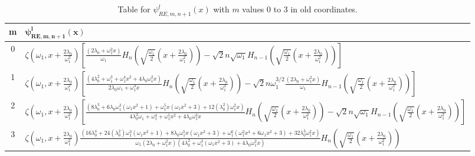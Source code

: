 \documentclass[a4paper, 12pt]{article}
\begin{document}
\begin{table}[htp]%
  \centering
  \renewcommand{\arraystretch}{2.2} %
  \setlength{\tabcolsep}{0.5em} %
  \begin{tabularx}{\textwidth}{|c|X}
  \toprule
  {\bf m} & $\mathbf{\psi_{RE,m,n+1}^l(x)}$ \\
  \toprule
  0 & 
  $\zeta\left(\omega_1,x + \frac{2\lambda_0}{\omega_1^2}\right)\left[\frac{\left(2 \lambda_0 + \omega_1^2 x\right)}{\omega_1} H_n\left(\sqrt{\frac{\omega_1}{2}}\left(x + \frac{2 \lambda_0}{\omega_1^2}\right)\right) 
  - \sqrt{2} n \sqrt{\omega_1} H_{n-1}\left(\sqrt{\frac{\omega_1}{2}}\left(x + \frac{2 \lambda_0}{\omega_1^2}\right)\right)\right]$ \\
  \midrule
  1 & 
  $\scriptstyle\zeta\left(\omega_1,x + \frac{2\lambda_0}{\omega_1^2}\right)\left[\frac{\left(4 \lambda_0^2 + \omega_1^3 + \omega_1^4 x^2 + 4 \lambda_0 \omega_1^2 x\right)}{2 \lambda_0 \omega_1 + \omega_1^3 x} H_n\left(\sqrt{\frac{\omega_1}{2}}\left(x + \frac{2 \lambda_0}{\omega_1^2}\right)\right) 
  - \sqrt{2} n \omega_1^{3/2} \frac{\left(2 \lambda_0 + \omega_1^2 x\right)}{\omega_1} H_{n-1}\left(\sqrt{\frac{\omega_1}{2}}\left(x + \frac{2 \lambda_0}{\omega_1^2}\right)\right)\right]$ \\
  \midrule
  2 & 
  $\scriptstyle\zeta\left(\omega_1,x + \frac{2\lambda_0}{\omega_1^2}\right)\left[\frac{\left(8 \lambda_0^3 + 6 \lambda_0 \omega_1^3 (\omega_1 x^2 + 1) + \omega_1^5 x (\omega_1 x^2 + 3) + 12 (\lambda_0^2) \omega_1^2 x\right)}{4 \lambda_0^2 \omega_1 + \omega_1^4 + \omega_1^5 x^2 + 4 \lambda_0 \omega_1^3 x} H_n\left(\sqrt{\frac{\omega_1}{2}}\left(x + \frac{2 \lambda_0}{\omega_1^2}\right)\right) 
  - \sqrt{2} n \sqrt{\omega_1} H_{n-1}\left(\sqrt{\frac{\omega_1}{2}}\left(x + \frac{2 \lambda_0}{\omega_1^2}\right)\right)\right]$ \\
  \midrule
  3 & 
  $\zeta\left(\omega_1,x + \frac{2\lambda_0}{\omega_1^2}\right)\frac{\left(16 \lambda_0^4 + 24 (\lambda_0^2) \omega_1^3 (\omega_1 x^2 + 1) + 8 \lambda_0 \omega_1^5 x (\omega_1 x^2 + 3) + \omega_1^6 (\omega_1^2 x^4 + 6 \omega_1 x^2 + 3) + 32 \lambda_0^3 \omega_1^2 x\right)}{\omega_1 \left(2 \lambda_0 + \omega_1^2 x\right) \left(4 \lambda_0^2 + \omega_1^3 (\omega_1 x^2 + 3) + 4 \lambda_0 \omega_1^2 x\right)} H_n\left(\sqrt{\frac{\omega_1}{2}}\left(x + \frac{2 \lambda_0}{\omega_1^2}\right)\right)$ \\
  \bottomrule
  \end{tabularx}
  \caption{Table for $\psi_{RE,m,n+1}^l(x)$ with $m$ values 0 to 3 in old coordinates.}
  \label{Tab:1D-psin-}
\end{table}
\end{document}
